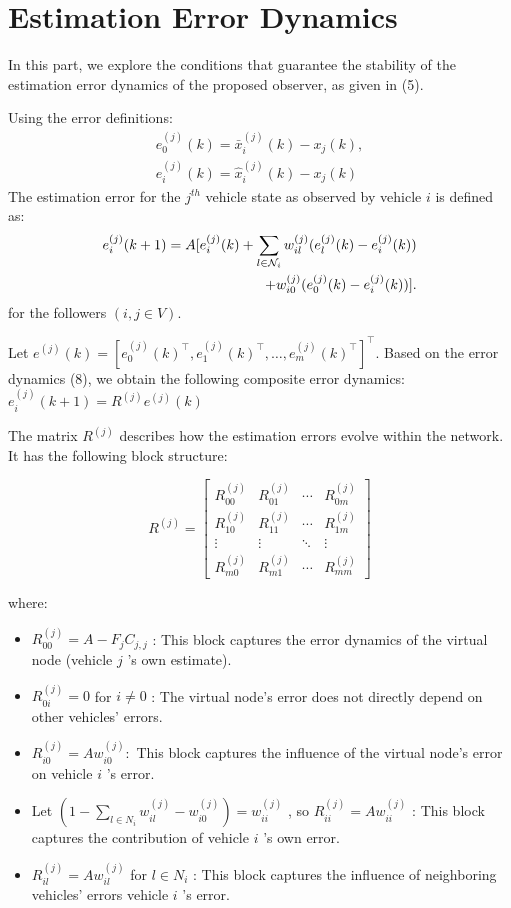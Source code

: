 \documentclass[letterpaper, 10pt, conference]{ieeeconf}  %
\begin{document}
\section{Estimation Error Dynamics}
In this part, we explore the conditions that guarantee the stability of the
estimation error dynamics of the proposed observer, as given in (5).

Using the error definitions:
\begin{align*}
e_0^{(j)}(k) = \bar{x}_i^{(j)}(k) - x_j(k),
\\
e_i^{(j)}(k) = \hat{x}_i^{(j)}(k) - x_j(k)
\end{align*}
The estimation error for the $j^{th}$ vehicle state as observed by vehicle $i$ is defined as:
\begin{align}
    e_i^{(j)}(k+1) = A[e_i^{(j)}(k) + \sum_{l \in \mathcal{N}_i} w_{il}^{(j)} (e_l^{(j)}(k) - e_i^{(j)}(k)) \notag \\
    + w_{i0}^{(j)}(e_0^{(j)}(k) - e_i^{(j)}(k))]. 
\end{align}
for the followers $( i, j \in V )$.

Let $e^{(j)}(k)=\left[e_0^{(j)}(k)^{\top}, e_1^{(j)}(k)^{\top}, \ldots, e_m^{(j)}(k)^{\top}\right]^{\top}$. Based on the error dynamics (8), we obtain the following composite error dynamics:
$e_i^{(j)}(k+1) = R^{(j)} e^{(j)}(k) $

The matrix $R^{(j)}$ describes how the estimation errors evolve within the network. It has the following block structure:

$$
R^{(j)}=\left[\begin{array}{cccc}
R_{00}^{(j)} & R_{01}^{(j)} & \cdots & R_{0 m}^{(j)} \\
R_{10}^{(j)} & R_{11}^{(j)} & \cdots & R_{1 m}^{(j)} \\
\vdots & \vdots & \ddots & \vdots \\
R_{m 0}^{(j)} & R_{m 1}^{(j)} & \cdots & R_{m m}^{(j)}
\end{array}\right]
$$

where:
\begin{itemize}
    \item  $R_{00}^{(j)}=A-F_j C_{j, j}$ : This block captures the error dynamics of the virtual node (vehicle $j$ 's own estimate).
    \item $R_{0 i}^{(j)}=0$ for $i \neq 0$ : The virtual node's error does not directly depend on other vehicles' errors.
    \item $R_{i 0}^{(j)}=A w_{i 0}^{(j)}:$ This block captures the influence of the virtual node's error on vehicle $i$ 's error.
    \item Let $\left(1-\sum_{l \in N_i} w_{i l}^{(j)}-w_{i 0}^{(j)}\right) = w_{i i}^{(j)}$ 
    , so $R_{i i}^{(j)}=A w_{i i}^{(j)}$ : This block captures the contribution of vehicle $i$ 's own error. 
    \item $R_{i l}^{(j)}=A w_{i l}^{(j)}$ for $l \in N_i$ : This block captures the influence of neighboring vehicles' errors vehicle $i$ 's error.
\end{itemize}
\end{document}
